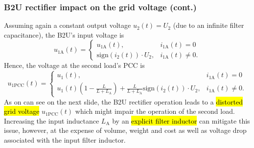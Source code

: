 \begin{frame}
    \frametitle{B2U rectifier impact on the grid voltage (cont.)}
    Assuming again a constant output voltage $u_2(t)=U_2$ (due to an infinite filter capacitance), the B2U's input voltage is
    \begin{equation}
        u_{1\mathrm{A}}(t) = \begin{cases} u_{1\mathrm{A}}(t), &i_{1\mathrm{A}}(t)=0\\ \mathrm{sign}(i_2(t))\cdot U_2, &i_{1\mathrm{A}}(t) \neq 0.
        \end{cases}
    \end{equation}\pause
    Hence, the voltage at the second load's PCC is
    \begin{equation}
        u_{1\mathrm{PCC}}(t) = \begin{cases} u_1(t), & i_{1\mathrm{A}}(t)=0\\  u_1(t)\left(1-\frac{L}{L+L_\mathrm{A}}\right) + \frac{L}{L+L_\mathrm{A}}\mathrm{sign}(i_2(t))\cdot U_2, & i_{1\mathrm{A}}(t) \neq 0. \end{cases}
    \end{equation}\pause
    As on can see on the next slide, the B2U rectifier operation leads to a \hl{distorted grid voltage} $u_{1\mathrm{PCC}}(t)$ which might impair the operation of the second load. Increasing the input inductance $L_\mathrm{A}$ by an \hl{explicit filter inductor} can mitigate this issue, however, at the expense of volume, weight and cost as well as voltage drop associated with the input filter inductor.
\end{frame}

